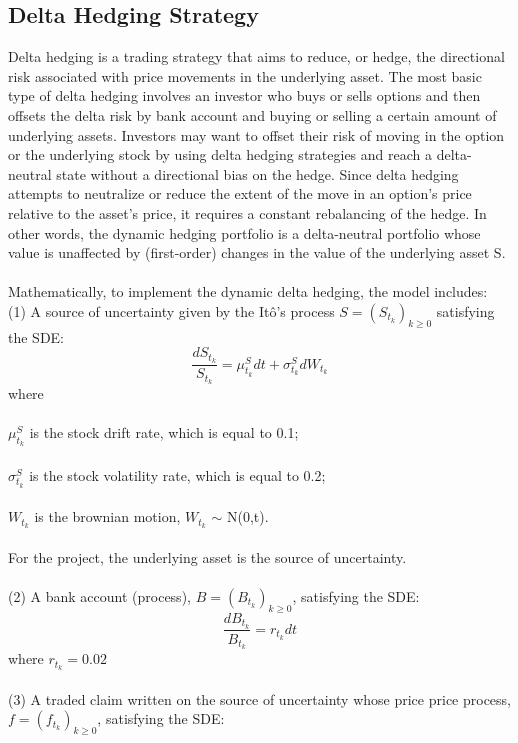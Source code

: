 \documentclass[12pt]{article}
\begin{document}
\subsection{Delta Hedging Strategy}
Delta hedging is a trading strategy that aims to reduce, or hedge, the directional risk associated with price movements in the underlying asset. The most basic type of delta hedging involves an investor who buys or sells options and then offsets the delta risk by bank account and buying or selling a certain amount of underlying assets. Investors may want to offset their risk of moving in the option or the underlying stock by using delta hedging strategies and reach a delta-neutral state without a directional bias on the hedge. Since delta hedging attempts to neutralize or reduce the extent of the move in an option's price relative to the asset's price, it requires a constant rebalancing of the hedge. In other words, the dynamic hedging portfolio is a delta-neutral portfolio whose value is unaffected by (first-order) changes in the value of the underlying asset S.\\
\\Mathematically, to implement the dynamic delta hedging, the model includes:\\
(1) A source of uncertainty given by the Itô's process $S=(S_{t_k})_{k \geq 0}$ satisfying the SDE:
\begin{equation}
    {\frac{dS_{t_k}}{S_{t_k}}} = {\mu^S_{t_k}} {dt} + {\sigma^S_{t_k}}{dW_{t_k}}
\end{equation}
where\\
\\${\mu^S_{t_k}}$ is the stock drift rate, which is equal to 0.1;\\
\\${\sigma^S_{t_k}}$ is the stock volatility rate, which is equal to 0.2;\\
\\${W_{t_k}}$ is the brownian motion, ${W_{t_k}}$ $\sim$ N(0,t).\\
\\For the project, the underlying asset is the source of uncertainty.\\
\\(2) A bank account (process), $B=(B_{t_k})_{k \geq 0}$, satisfying the SDE:
\begin{equation}
    {\frac{dB_{t_k}}{B_{t_k}}} = {r_{t_k}}{dt}
\end{equation}
where ${r_{t_k}}=0.02$\\
\\(3) A traded claim written on the source of uncertainty whose price price process, $f=(f_{t_k})_{k \geq 0}$, satisfying the SDE:
\end{document}
